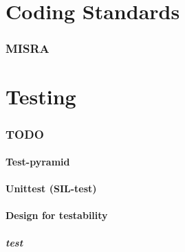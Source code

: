 \documentclass{beamer}
\begin{document}
\part{Coding Standards}
\section{MISRA}
\begin{frame}

\end{frame}


\part{Testing}
\section{TODO}
\subsection{Test-pyramid}
\begin{frame}

\end{frame}

\subsection{Unittest (SIL-test)}
\begin{frame}

\end{frame}

\subsection{Design for testability}
\begin{frame}

\end{frame}

\subsubsection{test}
\begin{frame}

\end{frame}
\end{document}
